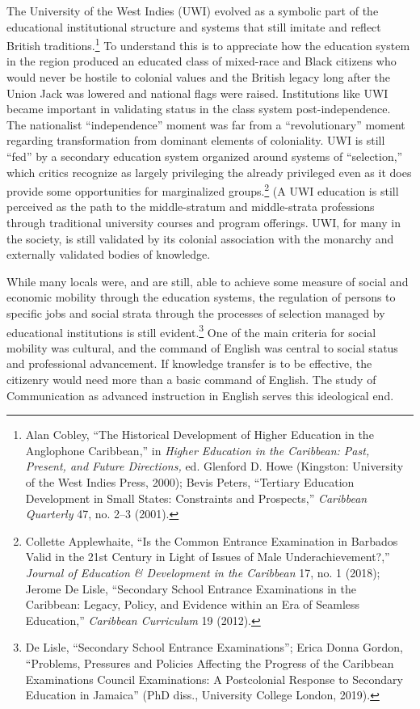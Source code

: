 \documentclass{tufte-handout}
\begin{document}
\enlargethispage{\baselineskip}

The University of the West Indies (UWI) evolved as a symbolic part of
the educational institutional structure and systems that still imitate
and reflect British traditions.\footnote{Alan Cobley, ``The Historical
  Development of Higher Education in the Anglophone Caribbean,'' in
  \emph{Higher Education in the Caribbean: Past, Present, and Future
  Directions,} ed. Glenford D. Howe (Kingston: University of the West
  Indies Press, 2000); Bevis Peters, ``Tertiary Education Development in
  Small States: Constraints and Prospects,'' \emph{Caribbean Quarterly}
  47, no. 2--3 (2001).} To understand this is to appreciate how the
education system in the region produced an educated class of mixed-race
and Black citizens who would never be hostile to colonial values and the
British legacy long after the Union Jack was lowered and national flags
were raised. Institutions like UWI became important in validating status
in the class system post-independence. The nationalist ``independence''
moment was far from a ``revolutionary'' moment regarding transformation
from dominant elements of coloniality. UWI is still ``fed'' by a
secondary education system organized around systems of ``selection,''
which critics recognize as largely privileging the already privileged
even as it does provide some opportunities for marginalized
groups.\footnote{Collette Applewhaite, ``Is the Common Entrance
  Examination in Barbados Valid in the 21st Century in Light of Issues
  of Male Underachievement?,'' \emph{Journal of Education \& Development
  in the Caribbean} 17, no. 1 (2018); Jerome De Lisle, ``Secondary
  School Entrance Examinations in the Caribbean: Legacy, Policy, and
  Evidence within an Era of Seamless Education,'' \emph{Caribbean
  Curriculum} 19 (2012).} (A UWI education is still perceived as the
path to the middle-stratum and middle-strata professions through
traditional university courses and program offerings. UWI, for many in
the society, is still validated by its colonial association with the
monarchy and externally validated bodies of knowledge.

While many locals were, and are still, able to achieve some measure of
social and economic mobility through the education systems, the
regulation of persons to specific jobs and social strata through the
processes of selection managed by educational institutions is still
evident.\footnote{De Lisle, ``Secondary School Entrance Examinations'';
  Erica Donna Gordon, ``Problems, Pressures and Policies Affecting the
  Progress of the Caribbean Examinations Council Examinations: A
  Postcolonial Response to Secondary Education in Jamaica'' (PhD diss.,
  University College London, 2019).} One of the main criteria for social
mobility was cultural, and the command of English was central to social
status and professional advancement. If knowledge transfer is to be
effective, the citizenry would need more than a basic command of
English. The study of Communication as advanced instruction in English
serves this ideological end.
\end{document}
